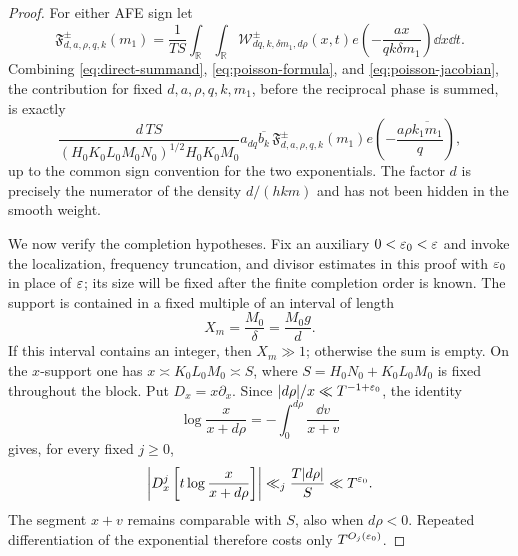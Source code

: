 \begin{proof}
For either AFE sign let
\begin{equation}\label{eq:completed-actual-weight}
 \mathfrak F_{d,a,\rho,q,k}^{\pm}(m_1)
 =\frac1{TS}\int_{\mathbb R}\int_{\mathbb R}
 \mathscr W^{\pm}_{dq,k,\delta m_1,d\rho}(x,t)
 e\!\left(-\frac{ax}{qk\delta m_1}\right)\dd x\dd t.
\end{equation}
Combining \eqref{eq:direct-summand}, \eqref{eq:poisson-formula}, and
\eqref{eq:poisson-jacobian}, the contribution for fixed
$d,a,\rho,q,k,m_1$, before the reciprocal phase is summed, is exactly
\begin{equation}\label{eq:completed-exact-factorization}
 \frac{d\,TS}
 {(H_0K_0L_0M_0N_0)^{1/2}H_0K_0M_0}
 a_{dq}\overline{b_k}\,
 \mathfrak F_{d,a,\rho,q,k}^{\pm}(m_1)
 e\!\left(-\frac{a\rho\overline{k_1m_1}}q\right),
\end{equation}
up to the common sign convention for the two exponentials.  The factor $d$
is precisely the numerator of the density $d/(hkm)$ and has not been hidden
in the smooth weight.

We now verify the completion hypotheses.  Fix an auxiliary
$0<\varepsilon_0<\varepsilon$ and invoke the localization, frequency truncation, and
divisor estimates in this proof with $\varepsilon_0$ in place of $\varepsilon$; its size
will be fixed after the finite completion order is known.  The support is
contained in a
fixed multiple of an interval of length
\begin{equation}\label{eq:completed-Xm}
                  X_m=\frac{M_0}{\delta}=\frac{M_0g}{d}.
\end{equation}
If this interval contains an integer, then $X_m\gg1$; otherwise the sum is
empty.  On the $x$-support one has
$x\asymp K_0L_0M_0\asymp S$, where
$S=H_0N_0+K_0L_0M_0$ is fixed throughout the block.  Put
$D_x=x\partial_x$.  Since $|d\rho|/x\ll T^{-1+\varepsilon_0}$, the identity
\[
 \log\frac{x}{x+d\rho}=-\int_0^{d\rho}\frac{\dd v}{x+v}
\]
gives, for every fixed $j\geq0$,
\begin{equation}\label{eq:completed-phase-x-derivatives}
 \left|D_x^j\left[t\log\frac{x}{x+d\rho}\right]\right|
 \ll_j\frac{T|d\rho|}{S}\ll T^{\varepsilon_0}.
\end{equation}
The segment $x+v$ remains comparable with $S$, also when $d\rho<0$.
Repeated differentiation of the exponential therefore costs only
$T^{O_j(\varepsilon_0)}$.


\end{proof}
